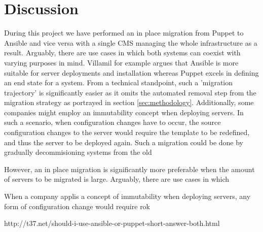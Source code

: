 \section{Discussion}\label{sec:discussion}
During this project we have performed an in place migration from Puppet to Ansible and vice versa with a single CMS managing the whole infrastructure as a result. Arguably, there are use cases in which both systems can coexist with varying purposes in mind. Villamil \cite{} for example argues that Ansible is more suitable for server deployments and installation whereas Puppet excels in defining an end state for a system. From a technical standpoint, such a 'migration trajectory' is significantly easier as it omits the automated removal step from the migration strategy as portrayed in section \ref{sec:methodology}. Additionally, some companies might employ an immutability concept when deploying servers. In such a scenario, when configuration changes have to occur, the source configuration changes to the server would require the template to be redefined, and thus the server to  be deployed again. Such a migration could be done by gradually decommisioning systems from the old 

However, an in place migration is significantly more preferable when the amount of servers to be migrated is large.  
Arguably, there are use cases in which 


When a company applis a concept of immutability when deploying servers, any form of configuration change would require rok 

http://t37.net/should-i-use-ansible-or-puppet-short-answer-both.html
